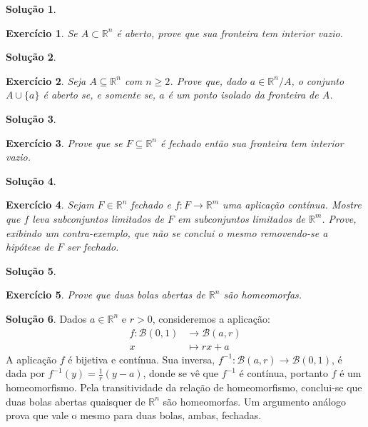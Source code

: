 \documentclass[a4paper,12pt]{article}
\newcommand{\R}{\mathbb{R}}
\newcommand{\B}{\mathcal{B}}
\theoremstyle{exer}
\newtheorem{exercise}{Exercício}
\theoremstyle{definition}
\newtheorem{solution}{Solução}
\theoremstyle{plain}
\begin{document}
\begin{solution}
 
\end{solution}

\begin{exercise}
    Se $A \subset \R^n$ é aberto, prove que sua fronteira tem interior vazio.
\end{exercise}

\begin{solution}

\end{solution}

\begin{exercise}
    Seja $A \subseteq \R^n$ com $n \ge 2$. Prove que, dado $a \in \R^n/A$, o
    conjunto $A \cup \{a\}$ é aberto se, e somente se, $a$ é um ponto isolado da
    fronteira de $A$.
\end{exercise}

\begin{solution}
    
\end{solution}

\begin{exercise}
    Prove que se $F \subseteq \R^n$ é fechado então sua fronteira tem interior vazio.
\end{exercise}

\begin{solution}
    
\end{solution}

\begin{exercise}
    Sejam $F \in \R^n$ fechado e $f : F \to \R^m$ uma aplicação contínua.
    Mostre que $f$ leva subconjuntos limitados de $F$ em subconjuntos
    limitados de $\R^m$. Prove, exibindo um contra-exemplo, que não se conclui o mesmo removendo-se a hipótese de $F$ ser fechado.
\end{exercise}

\begin{solution}
    
\end{solution}

\begin{exercise}
    Prove que duas bolas abertas de $\R^n$ são homeomorfas.
\end{exercise}

\begin{solution}
    Dados $a \in \R^n$ e $r > 0$, consideremos a aplicação:
    \begin{align*}
        f : \B(0, 1) &\to \B(a, r)\\
        x &\mapsto rx + a        
    \end{align*}
    A aplicação $f$ é bijetiva e contínua. Sua inversa, $f^{-1} : \B(a, r) \to
    \B(0, 1)$, é dada por $f^{-1}(y) = \frac{1}{r}(y - a)$, donde se vê que
    $f^{-1}$ é contínua, portanto $f$ é um homeomorfismo. Pela transitividade
    da relação de homeomorfismo, conclui-se que duas bolas abertas quaisquer de
    $\R^n$ são homeomorfas. Um argumento análogo prova que vale o mesmo para duas bolas, ambas, fechadas.
\end{solution}
\end{document}
